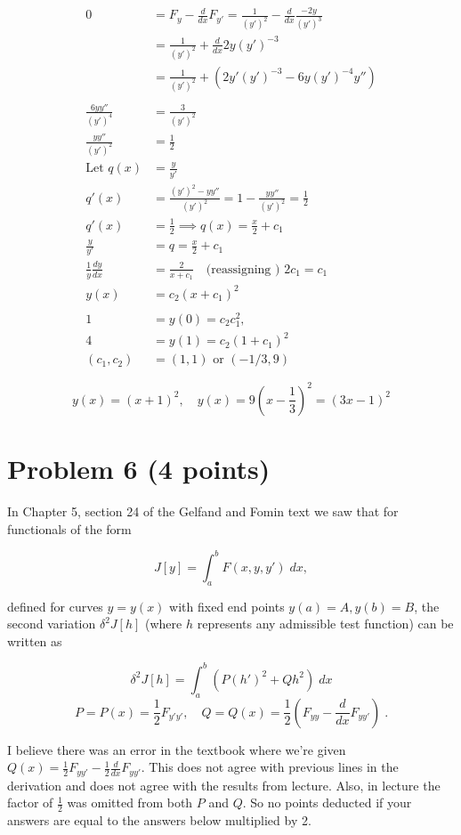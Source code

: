 \documentclass[a4paper]{article}
\begin{document}
\begin{align*}
0 &= F_y - \frac{d}{dx}F_{y'} = \frac{1}{(y')^2} - \frac{d}{dx}\frac{-2y}{(y')^3} \\
&= \frac{1}{(y')^2} + \frac{d}{dx}2y(y')^{-3}\\
&= \frac{1}{(y')^2} + (2y'(y')^{-3} -6y (y')^{-4} y'') \\
& \\
\frac{6yy''}{(y')^4} &= \frac{3}{(y')^2} \\
\frac{yy''}{(y')^2} &= \frac{1}{2} \\
\text{Let } q(x) &= \frac{y}{y'} \\
q' (x) &= \frac{(y')^2 - yy''}{(y')^2} = 1 - \frac{yy''}{(y')^2} = \frac{1}{2} \\
q'(x) &= \frac{1}{2} \implies q(x) = \frac{x}{2} + c_1 \\
\frac{y}{y'} &= q = \frac{x}{2} + c_1 \\
\frac{1}{y} \frac{dy}{dx} &= \frac{2}{x + c_1} \quad \text{(reassigning ) } 2c_1 = c_1 \\
y(x) &= c_2(x+c_1)^2 \\
& \\
1 &= y(0) = c_2c_1^2, \\
4 &= y(1) = c_2(1+c_1)^2 \\
(c_1,c_2) &= (1,1) \text{ or } (-1/3, 9)
\end{align*}

$$\boxed{ y(x) = (x+1)^2, \quad y(x) = 9\left(x-\frac{1}{3}\right)^2 = (3x-1)^2 } $$

\newpage

\section*{Problem 6 (4 points)}

In Chapter 5, section 24 of the Gelfand and Fomin text we saw that for functionals of the form

$$J[y] = \int_a^b F(x,y,y') \; dx, $$

defined for curves $y = y(x)$ with fixed end points $y(a) = A, y(b) = B$, the second variation $\delta^2 J[h]$ (where $h$ represents any admissible test function) can be written as

$$\delta^2 J[h] = \int_a^b (P(h')^2 + Qh^2) \; dx $$
$$ P = P(x) = \frac{1}{2}F_{y'y'}, \quad Q = Q(x) = \frac{1}{2}\left(F_{yy} - \frac{d}{dx}F_{yy'} \right) \;. $$

I believe there was an error in the textbook where we're given $Q(x) = \frac{1}{2}F_{yy'} - \frac{1}{2}\frac{d}{dx}F_{yy'}$. This does not agree with previous lines in the derivation and does not agree with the results from lecture. Also, in lecture the factor of $\frac{1}{2}$ was omitted from both $P$ and $Q$. So no points deducted if your answers are equal to the answers below multiplied by 2. \\
\end{document}
